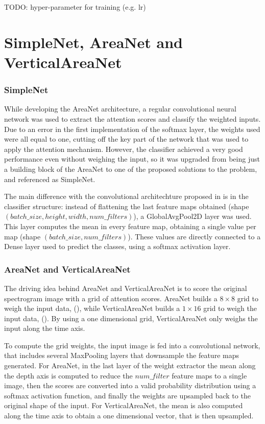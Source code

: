 TODO: hyper-parameter for training (e.g. lr)

\section{SimpleNet, AreaNet and VerticalAreaNet}

\subsubsection{SimpleNet}

While developing the AreaNet architecture, a regular convolutional neural
network was used to extract the attention scores and classify the weighted
inputs.
Due to an error in the first implementation of the softmax layer, the weights
used were all equal to one, cutting off the key part of the network that was
used to apply the attention mechanism.
However, the classifier achieved a very good performance even without weighing
the input, so it was upgraded from being just a building block of the AreaNet
to one of the proposed solutions to the problem, and referenced as SimpleNet.

The main difference with the convolutional architechture proposed in
 is in the classifier structure:
instead of flattening the last feature maps obtained
(shape $(batch\_size, height, width, num\_filters)$),
a GlobalAvgPool2D layer was used.
This layer computes the mean in every feature map, obtaining a single value per
map (shape $(batch\_size, num\_filters)$).
These values are directly connected to a Dense layer used to predict the classes,
using a softmax activation layer.

\subsubsection{AreaNet and VerticalAreaNet}

The driving idea behind AreaNet and VerticalAreaNet is to score the original
spectrogram image with a grid of attention scores.
AreaNet builds a $8 \times 8$ grid to weigh the input data,
(),
while
VerticalAreaNet builds a $1 \times 16$ grid to weigh the input data,
().
By using a one dimensional grid, VerticalAreaNet only weighs the input along
the time axis.

To compute the grid weights, the input image is fed into a convolutional network,
that includes several MaxPooling layers that downsample the feature maps generated.
For AreaNet, in the last layer of the weight extractor the mean along the depth
axis is computed to reduce the $num\_filter$ feature maps to a single image,
then the scores are converted into a valid probability distribution using a
softmax activation function, and finally the weights are upsampled back to the
original shape of the input.
For VerticalAreaNet, the mean is also computed along the time axis to obtain
a one dimensional vector, that is then upsampled.

